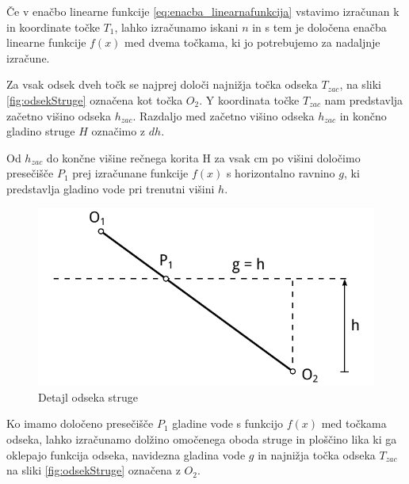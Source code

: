 Če v enačbo linearne funkcije \ref{eq:enacba_linearnafunkcija} vstavimo izračunan k in koordinate točke $T_1$, lahko izračunamo iskani $n$ in s tem je določena enačba linearne funkcije $f(x)$ med dvema točkama, ki jo potrebujemo za nadaljnje izračune. 



Za vsak odsek dveh točk se najprej določi najnižja točka odseka $T_{zac}$, na sliki \ref{fig:odsekStruge} označena kot točka $O_2$. Y koordinata točke $T_{zac}$ nam predstavlja začetno višino odseka $h_{zac}$. Razdaljo med začetno višino odseka $h_{zac}$ in končno gladino struge $H$ označimo z $dh$.

Od $h_{zac}$ do končne višine rečnega korita H za vsak cm po višini določimo presečišče $P_1$ prej izračunane funkcije $f(x)$ s horizontalno ravnino $g$, ki predstavlja gladino vode pri trenutni višini $h$.


\begin{figure}[ht!]
	\begin{centering}
		\includegraphics{slike/customChannel/odsek_detajl.pdf}
		\caption{Detajl odseka struge}
	\end{centering}
\end{figure}



Ko imamo določeno presečišče $P_1$ gladine vode s funkcijo $f(x)$ med točkama odseka, lahko izračunamo dolžino omočenega oboda struge in ploščino lika ki ga oklepajo funkcija odseka, navidezna gladina vode $g$ in najnižja točka odseka $T_{zac}$ na sliki \ref{fig:odsekStruge} označena z $O_2$.


